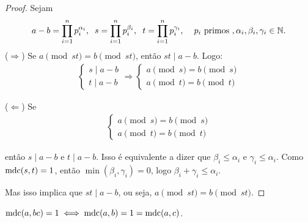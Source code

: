 	\begin{proof}
		Sejam 
		\begin{align*}
		    a - b = \prod_{i = 1}^{n}p_i^{\alpha_i}, \hspace{0.2cm} s 
		    = \prod_{i = 1}^{n}p_i^{\beta_i}, \hspace{0.2cm} t 
		    = \prod_{i=1}^{n}p_i^{\gamma_i}, \hspace{0.4cm} p_i
		    \text{ primos }, \alpha_i, \beta_i, \gamma_i\in\mathbb{N}.
		\end{align*}
		($\Rightarrow$) Se $a\pmod {st} = b\pmod {st}$, então $st\mid a-b$. 
		Logo:
		\begin{align*}
            \begin{cases}
                s \mid a-b \\
                t \mid a-b
            \end{cases}
		\Rightarrow
            \begin{cases}
                a\pmod s = b\pmod s \\
                a\pmod t = b\pmod t
            \end{cases}
		\end{align*}
		\par\vspace{0.3cm}($\Leftarrow$) Se
		\begin{align*}
            \begin{cases}
                a\pmod s = b\pmod s \\
                a\pmod t = b\pmod t
            \end{cases}
		\end{align*}
		\par\vspace{0.3cm} então $s\mid a-b$ e $t \mid a-b$. 
		Isso é equivalente a dizer que $\beta_i\leq\alpha_i$ e
		$\gamma_i\leq\alpha_i$. Como $\operatorname{mdc}(s,t) = 1$, então 
		$\min(\beta_i, \gamma_i) = 0$, logo 
		$\beta_i + \gamma_i \leq \alpha_i$.
		\par\vspace{0.3cm} Mas isso implica que $st\mid a-b$, ou seja, 
		$a\pmod {st} = b\pmod {st}$.
	\end{proof}
	\begin{lemma}
	\label{lema2}
		$\operatorname{mdc}(a,bc) = 1 \iff \operatorname{mdc}(a,b) = 1 = \operatorname{mdc}(a,c)$.
	\end{lemma}
